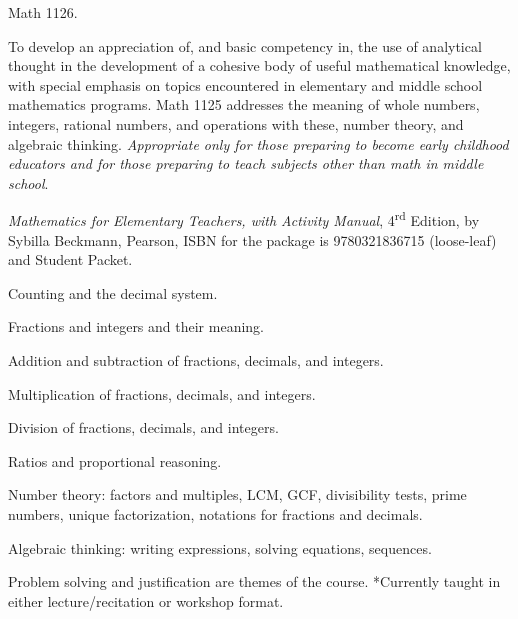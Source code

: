 \documentclass{osucourse}
\begin{document}
\CatalogDescription
\PrerequisitesAndExclusions

\begin{FollowupCourses}
Math 1126.
\end{FollowupCourses}

\begin{Purpose}
To develop an appreciation of, and basic competency in, the use of analytical thought in the development of a cohesive body of useful mathematical knowledge, with special emphasis on topics encountered in elementary and middle school mathematics programs. Math 1125 addresses the meaning of whole numbers, integers, rational numbers, and operations with these, number theory, and algebraic thinking. \emph{Appropriate only for those preparing to become early childhood educators and for those preparing to teach subjects other than math in middle school}.
\end{Purpose}

\begin{Text}
\emph{Mathematics for Elementary Teachers, with Activity Manual}, 4\textsuperscript{rd} Edition, by Sybilla Beckmann, Pearson, ISBN for the package is 9780321836715 (loose-leaf) and Student Packet.
\end{Text}

\begin{TopicsList}
\item Counting and the decimal system.
\item Fractions and integers and their meaning.
\item Addition and subtraction of fractions, decimals, and integers.
\item Multiplication of fractions, decimals, and integers.
\item Division of fractions, decimals, and integers.
\item Ratios and proportional reasoning.
\item Number theory: factors and multiples, LCM, GCF, divisibility tests, prime numbers, unique factorization, notations for fractions and decimals.
\item Algebraic thinking: writing expressions, solving equations, sequences.
\item Problem solving and justification are themes of the course. *Currently taught in either lecture/recitation or workshop format.
\end{TopicsList}
\end{document}
